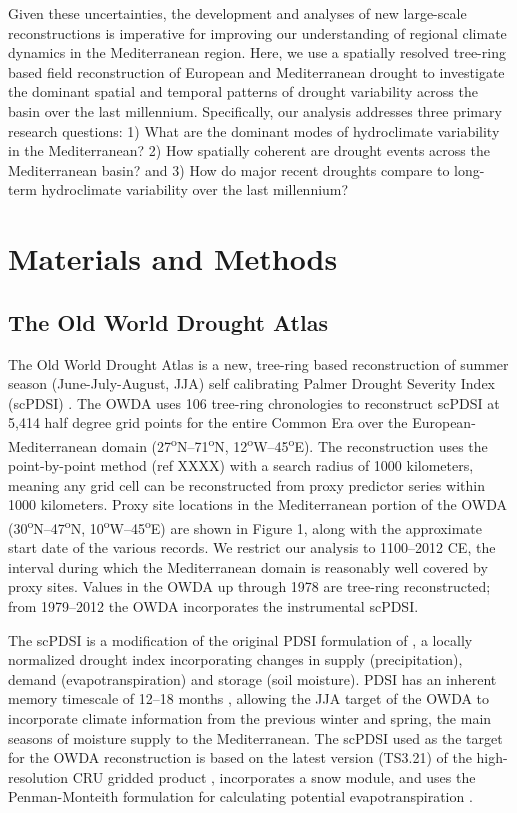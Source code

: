 \documentclass[draft,jgr]{AGUTeX}
\begin{document}
\begin{article}
\indent Given these uncertainties, the development and analyses of new large-scale reconstructions is imperative for improving our understanding of regional climate dynamics in the Mediterranean region. Here, we use a spatially resolved tree-ring based field reconstruction of European and Mediterranean drought to investigate the dominant spatial and temporal patterns of drought variability across the basin over the last millennium. Specifically, our analysis addresses three primary research questions: 1) What are the dominant modes of hydroclimate variability in the Mediterranean? 2) How spatially coherent are drought events across the Mediterranean basin? and 3) How do major recent droughts compare to long-term hydroclimate variability over the last millennium?

\section{Materials and Methods}
\subsection{The Old World Drought Atlas}
\noindent The Old World Drought Atlas \citep[OWDA;][]{CookOWDA2015} is a new, tree-ring based reconstruction of summer season (June-July-August, JJA) self calibrating Palmer Drought Severity Index (scPDSI) \citep{Schrier2013}. The OWDA uses 106 tree-ring chronologies to reconstruct scPDSI at 5,414 half degree grid points for the entire Common Era over the European-Mediterranean domain (27\textsuperscript{o}N--71\textsuperscript{o}N, 12\textsuperscript{o}W--45\textsuperscript{o}E). The reconstruction uses the point-by-point method (ref XXXX) with a search radius of 1000 kilometers, meaning any grid cell can be reconstructed from proxy predictor series within 1000 kilometers. Proxy site locations in the Mediterranean portion of the OWDA (30\textsuperscript{o}N--47\textsuperscript{o}N, 10\textsuperscript{o}W--45\textsuperscript{o}E) are shown in Figure 1, along with the approximate start date of the various records. We restrict our analysis to 1100--2012 CE, the interval during which the Mediterranean domain is reasonably well covered by proxy sites. Values in the OWDA up through 1978 are tree-ring reconstructed; from 1979--2012 the OWDA incorporates the instrumental scPDSI. 

\indent  The scPDSI is a modification of the original PDSI formulation of \cite{Palmer1965}, a locally normalized drought index incorporating changes in supply (precipitation), demand (evapotranspiration) and storage (soil moisture). PDSI has an inherent memory timescale of 12--18 months \citep{Guttman1998,Vicente2010}, allowing the JJA target of the OWDA to incorporate climate information from the previous winter and spring, the main seasons of moisture supply to the Mediterranean. The scPDSI used as the target for the OWDA reconstruction is based on the latest version (TS3.21) of the high-resolution CRU gridded product \citep{Harris2014}, incorporates a snow module, and uses the Penman-Monteith formulation for calculating potential evapotranspiration \citep{Schrier2013}.


\end{article}
\end{document}

